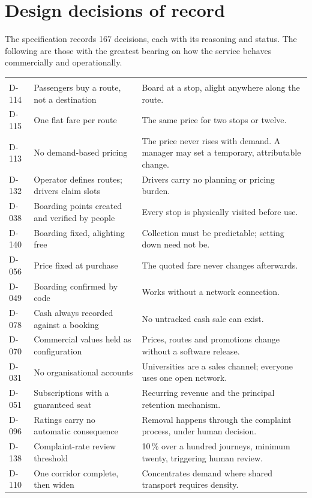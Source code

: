 \appendix
\chapter{Design decisions of record}

The specification records 167 decisions, each with its reasoning and status. The following are those
with the greatest bearing on how the service behaves commercially and operationally.

\begin{longtable}{@{}L{14mm}L{48mm}L{84mm}@{}}
\toprule
{} &  &  \\
\midrule
\endfirsthead
\toprule
{} &  &  \\
\midrule
\endhead
\bottomrule
\endfoot
D-114 & Passengers buy a route, not a destination & Board at a stop, alight anywhere along the route. \\
D-115 & One flat fare per route & The same price for two stops or twelve. \\
D-113 & No demand-based pricing & The price never rises with demand. A manager may set a temporary, attributable change. \\
D-132 & Operator defines routes; drivers claim slots & Drivers carry no planning or pricing burden. \\
D-038 & Boarding points created and verified by people & Every stop is physically visited before use. \\
D-140 & Boarding fixed, alighting free & Collection must be predictable; setting down need not be. \\
D-056 & Price fixed at purchase & The quoted fare never changes afterwards. \\
D-049 & Boarding confirmed by code & Works without a network connection. \\
D-078 & Cash always recorded against a booking & No untracked cash sale can exist. \\
D-070 & Commercial values held as configuration & Prices, routes and promotions change without a software release. \\
D-031 & No organisational accounts & Universities are a sales channel; everyone uses one open network. \\
D-051 & Subscriptions with a guaranteed seat & Recurring revenue and the principal retention mechanism. \\
D-096 & Ratings carry no automatic consequence & Removal happens through the complaint process, under human decision. \\
D-138 & Complaint-rate review threshold & 10\,\% over a hundred journeys, minimum twenty, triggering human review. \\
D-110 & One corridor complete, then widen & Concentrates demand where shared transport requires density. \\
\end{longtable}

